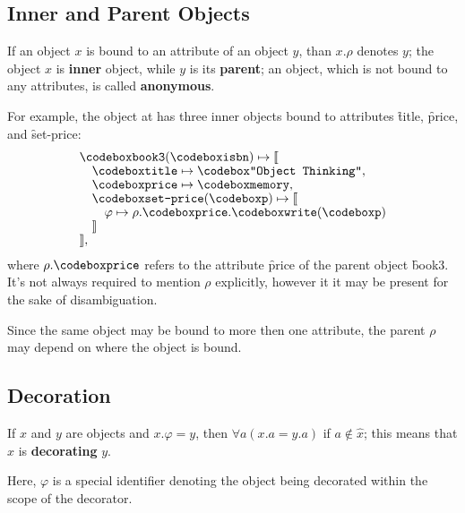\subsection{Inner and Parent Objects}

\begin{eodefinition}\label{def:parent}
If an object $x$ is bound to an attribute of
an object $y$, than $x.\rho$ denotes $y$;
the object $x$ is \textbf{inner} object, while $y$ is its \textbf{parent};
an object, which is not bound to any attributes, is called \textbf{anonymous}.
\end{eodefinition}

For example, the object at 
has three inner objects bound to attributes \f{title}, \f{price}, and \f{set-price}:
\begin{equation}\label{eq:book3}
\begin{split}
& \f{book3}(\f{isbn}) \mapsto \llbracket \br
& \quad \f{title} \mapsto \f{"Object Thinking"}, \br
& \quad \f{price} \mapsto \f{memory}, \br
& \quad \f{set-price}(\f{p}) \mapsto \llbracket \br
& \quad \quad \varphi \mapsto \rho.\f{price}.\f{write}(\f{p}) \br
& \quad \rrbracket \br
& \rrbracket, \\
\end{split}
\end{equation}
where $\rho.\f{price}$ refers to the attribute \f{price}
of the parent object \f{book3}. It's not always required to mention
$\rho$ explicitly, however it it may be present for the sake of
disambiguation.

Since the same object may be bound to more then one attribute,
the parent $\rho$ may depend on where the object
is bound.

\subsection{Decoration}

\begin{eodefinition}\label{def:decorator}
If $x$ and $y$ are objects and $x.\varphi = y$, then
  $\forall a (x.a = y.a)$ if $a \not\in \hat{x}$;
  this means that $x$ is \textbf{decorating} $y$.
\end{eodefinition}

Here, $\varphi$ is a special identifier denoting the object being decorated
within the scope of the decorator.

